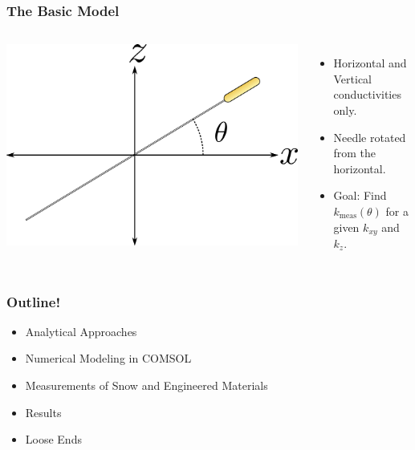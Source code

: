 \documentclass{beamer}
\begin{document}

\begin{frame}
\frametitle{The Basic Model}
\begin{columns}[c]
    \includegraphics[width=\textwidth]{fig/angle.png}
    \begin{itemize}
    \item Horizontal and Vertical conductivities only.
    \item Needle rotated from the horizontal.
    \item Goal: Find \(k_{\textrm{meas}}(\theta)\) for a given \(k_{xy}\) and \(k_z\).
    \end{itemize}
\end{columns}
\end{frame}


\begin{frame}
\frametitle{Outline!}
\begin{itemize}
\item Analytical Approaches
\item Numerical Modeling in COMSOL
\item Measurements of Snow and Engineered Materials
\item Results
\item Loose Ends
\end{itemize}
\end{frame}
\end{document}
